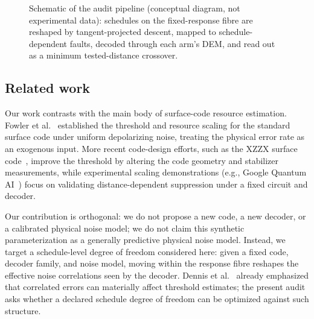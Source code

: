 \documentclass[11pt]{article}
\newcommand{\F}{\mathcal{F}}
\begin{document}
\begin{figure}[htbp]
\centering
{}
\caption{Schematic of the audit pipeline (conceptual diagram, not experimental data): schedules on the fixed-response fibre are reshaped by tangent-projected descent, mapped to schedule-dependent faults, decoded through each arm's DEM, and read out as a minimum tested-distance crossover.}
\label{fig:pipeline}
\end{figure}

\subsection{Related work}

Our work contrasts with the main body of surface-code resource estimation. Fowler et al.~\cite{Fowler2012} established the threshold and resource scaling for the standard surface code under uniform depolarizing noise, treating the physical error rate as an exogenous input. More recent code-design efforts, such as the XZZX surface code~\cite{Ataides2021}, improve the threshold by altering the code geometry and stabilizer measurements, while experimental scaling demonstrations (e.g., Google Quantum AI~\cite{Google2023}) focus on validating distance-dependent suppression under a fixed circuit and decoder.

Our contribution is orthogonal: we do not propose a new code, a new decoder, or a calibrated physical noise model; we do not claim this synthetic parameterization as a generally predictive physical noise model. Instead, we target a schedule-level degree of freedom considered here: given a fixed code, decoder family, and noise model, moving within the response fibre reshapes the effective noise correlations seen by the decoder. Dennis et al.~\cite{Dennis2002} already emphasized that correlated errors can materially affect threshold estimates; the present audit asks whether a declared schedule degree of freedom can be optimized against such structure.
\end{document}
